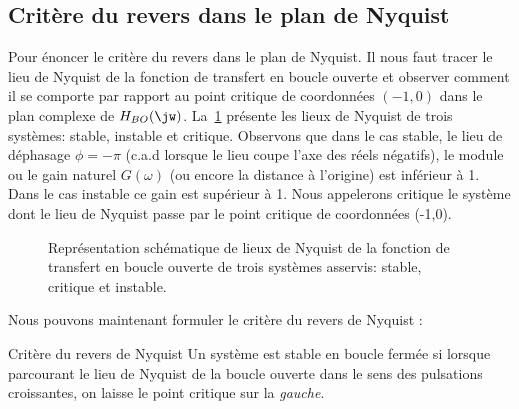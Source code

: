 \subsection{Critère du revers dans le plan de Nyquist
}
Pour énoncer le critère du revers dans le plan de Nyquist. Il nous faut tracer
le lieu de Nyquist de la fonction de transfert en boucle ouverte et observer 
comment il se comporte par rapport au point critique de coordonnées $(-1,0)$ 
dans le plan complexe de $H_{BO}(\jw)$. La~\cref{fig-nyquist_revers} présente 
les lieux de Nyquist de trois systèmes: stable, instable et critique. Observons
que dans le cas stable, le lieu de déphasage $\phi=-\pi$ (c.a.d lorsque le lieu
coupe l'axe des réels négatifs), le module ou le gain naturel $G(\omega)$ (ou 
encore la distance à l'origine) est inférieur à 1. Dans le cas instable ce gain 
est supérieur à 1. Nous appelerons critique le système dont le lieu de Nyquist 
passe par le point critique de coordonnées (-1,0).
\begin{figure}[!h]
    \centering
    
    \caption{Représentation schématique de lieux de Nyquist de la fonction 
             de transfert en boucle ouverte de trois systèmes asservis: 
             stable, critique et instable. \label{fig-nyquist_revers}}
\end{figure}
Nous pouvons maintenant formuler le critère du revers de Nyquist :
\begin{criteria}{Critère du revers de Nyquist}
    Un système est stable en boucle fermée si lorsque parcourant 
    le lieu de Nyquist de la boucle ouverte dans le sens des 
    pulsations croissantes, on laisse le point critique sur la 
    \emph{gauche}.
\end{criteria}
